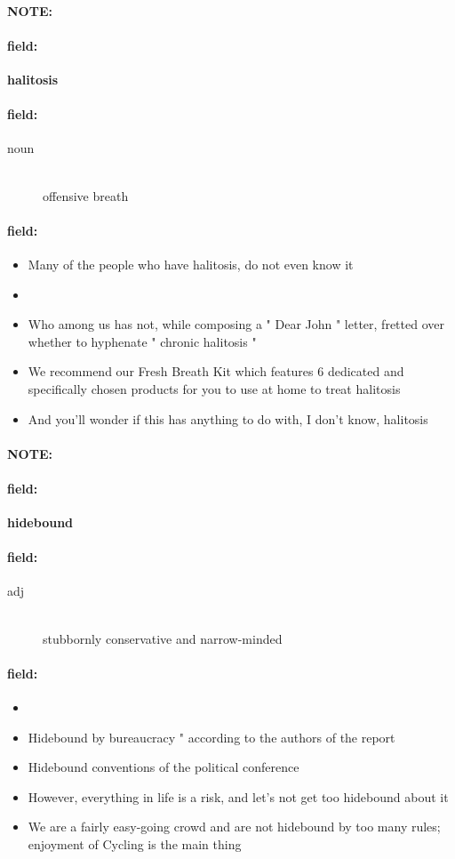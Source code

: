 \documentclass[12pt]{article}
\newenvironment{note}{\paragraph{NOTE:}}{}
\newenvironment{field}{\paragraph{field:}}{}
\begin{document}
\begin{note}
\begin{field}
\textbf{\large halitosis}
\end{field}


\begin{field}
\begin{description}
\item[noun] \hfill \\ 
offensive breath

\end{description}
\end{field}

\begin{field}
\begin{itemize}
\item Many of the people who have halitosis, do not even know it
\item 
\item Who among us has not, while composing a " Dear John " letter, fretted over whether to hyphenate " chronic halitosis " 
\item We recommend our Fresh Breath Kit which features 6 dedicated and specifically chosen products for you to use at home to treat halitosis
\item And you'll wonder if this has anything to do with, I don't know, halitosis
\end{itemize}
\end{field}
\end{note}
\begin{note}
\begin{field}
\textbf{\large hidebound}
\end{field}


\begin{field}
\begin{description}
\item[adj] \hfill \\ 
stubbornly conservative and narrow-minded

\end{description}
\end{field}

\begin{field}
\begin{itemize}
\item 
\item Hidebound by bureaucracy " according to the authors of the report
\item Hidebound conventions of the political conference
\item However, everything in life is a risk, and let's not get too hidebound about it
\item We are a fairly easy-going crowd and are not hidebound by too many rules; enjoyment of Cycling is the main thing
\end{itemize}
\end{field}
\end{note}
\end{document}
